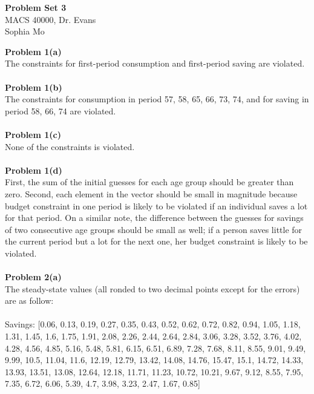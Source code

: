 \documentclass[letterpaper,12pt]{article}
\theoremstyle{definition}
\begin{document}
\begin{flushleft}
  \textbf{\large{Problem Set 3}} \\
  MACS 40000, Dr. Evans \\
  Sophia Mo
\end{flushleft}

\vspace{5mm}

\noindent\textbf{Problem 1(a)}\\
The constraints for first-period consumption and first-period saving are violated.\\
\\
\noindent\textbf{Problem 1(b)}\\
The constraints for consumption in period 57, 58, 65, 66, 73, 74, and for saving in period 58, 66, 74 are violated.\\
\\
\noindent\textbf{Problem 1(c)}\\
None of the constraints is violated.\\
\\
\noindent\textbf{Problem 1(d)}\\
First, the sum of the initial guesses for each age group should be greater than zero. Second, each element in the vector should be small in magnitude because budget constraint in one period is likely to be violated if an individual saves a lot for that period. On a similar note, the difference between the guesses for savings of two consecutive age groups should be small as well; if a person saves little for the current period but a lot for the next one, her budget constraint is likely to be violated.\\
\\
\noindent\textbf{Problem 2(a)}\\
The steady-state values (all ronded to two decimal points except for the errors) are as follow:\\
\\
Savings: [0.06, 0.13, 0.19, 0.27, 0.35, 0.43, 0.52, 0.62, 0.72, 0.82, 0.94, 1.05, 1.18, 1.31, 1.45, 1.6, 1.75, 1.91, 2.08, 2.26, 2.44, 2.64, 2.84, 3.06, 3.28, 3.52, 3.76, 4.02, 4.28, 4.56, 4.85, 5.16, 5.48, 5.81, 6.15, 6.51, 6.89, 7.28, 7.68, 8.11, 8.55, 9.01, 9.49, 9.99, 10.5, 11.04, 11.6, 12.19, 12.79, 13.42, 14.08, 14.76, 15.47, 15.1, 14.72, 14.33, 13.93, 13.51, 13.08, 12.64, 12.18, 11.71, 11.23, 10.72, 10.21, 9.67, 9.12, 8.55, 7.95, 7.35, 6.72, 6.06, 5.39, 4.7, 3.98, 3.23, 2.47, 1.67, 0.85]\\
\\
\end{document}
